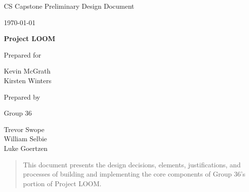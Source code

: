 \documentclass[onecolumn, draftclsnofoot,10pt, compsoc]{IEEEtran}
\def \CapstoneTeamName{		}
\def \CapstoneTeamNumber{		36}
\def \GroupMemberOne{			Trevor Swope}
\def \GroupMemberTwo{			William Selbie}
\def \GroupMemberThree{			Luke Goertzen}
\def \CapstoneProjectName{		Project LOOM}
\def \CapstoneSponsorPerson{	Chet Udell}
\def \DocType{	%
				Preliminary Design Document
				}
\newcommand{\NameSigPair}[1]{\par
\makebox[2.75in][r]{#1} \hfil 	\makebox[3.25in]{\makebox[2.25in]{\hrulefill} \hfill		\makebox[.75in]{\hrulefill}}
\par\vspace{-12pt} \textit{\tiny\noindent
\makebox[2.75in]{} \hfil		\makebox[3.25in]{\makebox[2.25in][r]{Signature} \hfill	\makebox[.75in][r]{Date}}}}
\begin{document}
\begin{titlepage}
    \begin{singlespace}
        \hfill 
        \par\vspace{.2in}
        \centering
        \scshape{
            \huge CS Capstone \DocType \par
            {\large\today}\par
            \vspace{.5in}
            \textbf{\Huge\CapstoneProjectName}\par
            \vfill
            {\large Prepared for}\par
            \Huge Kevin McGrath \\ Kirsten Winters \par
            \vspace{5pt}
            {\large Prepared by }\par
            Group\CapstoneTeamNumber\par
            \CapstoneTeamName\par 
            \vspace{5pt}
            \GroupMemberOne \\
            \GroupMemberTwo \\
            \GroupMemberThree \\
            \vspace{20pt}
        }
        \begin{abstract}
            This document presents the design decisions, elements, justifications, and processes of building and implementing the core components of Group 36's portion of Project LOOM.
        \end{abstract}     
    \end{singlespace}
\end{titlepage}
\newpage
{}
\tableofcontents
\clearpage
\end{document}
